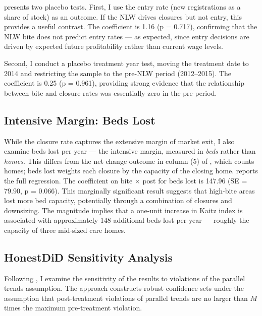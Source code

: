 \documentclass[12pt]{article}
\begin{document}
 presents two placebo tests. First, I use the entry rate (new registrations as a share of stock) as an outcome. If the NLW drives closures but not entry, this provides a useful contrast. The coefficient is 1.16 (p = 0.717), confirming that the NLW bite does not predict entry rates --- as expected, since entry decisions are driven by expected future profitability rather than current wage levels.



Second, I conduct a placebo treatment year test, moving the treatment date to 2014 and restricting the sample to the pre-NLW period (2012--2015). The coefficient is 0.25 (p = 0.961), providing strong evidence that the relationship between bite and closure rates was essentially zero in the pre-period.

\subsection{Intensive Margin: Beds Lost}

While the closure rate captures the extensive margin of market exit, I also examine beds lost per year --- the intensive margin, measured in \textit{beds} rather than \textit{homes}. This differs from the net change outcome in column (5) of , which counts homes; beds lost weights each closure by the capacity of the closing home.  reports the full regression. The coefficient on bite $\times$ post for beds lost is 147.96 (SE = 79.90, p = 0.066). This marginally significant result suggests that high-bite areas lost more bed capacity, potentially through a combination of closures and downsizing. The magnitude implies that a one-unit increase in Kaitz index is associated with approximately 148 additional beds lost per year --- roughly the capacity of three mid-sized care homes.



\subsection{HonestDiD Sensitivity Analysis}

Following \citet{rambachan2023more}, I examine the sensitivity of the results to violations of the parallel trends assumption. The \citet{rambachan2023more} approach constructs robust confidence sets under the assumption that post-treatment violations of parallel trends are no larger than $M$ times the maximum pre-treatment violation.
\end{document}
